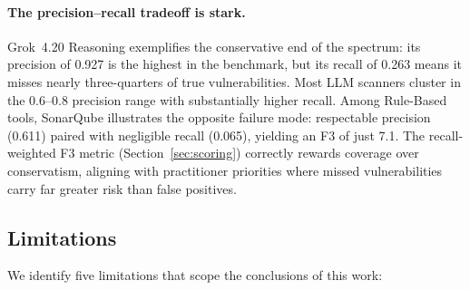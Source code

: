 \paragraph{The precision--recall tradeoff is stark.}
Grok~4.20 Reasoning exemplifies the conservative end of the spectrum:
its precision of 0.927 is the highest in the benchmark, but its recall
of 0.263 means it misses nearly three-quarters of true vulnerabilities.
Most LLM scanners cluster in the 0.6--0.8 precision range with
substantially higher recall.  Among
Rule-Based tools, SonarQube illustrates the opposite failure mode:
respectable precision (0.611) paired with negligible recall (0.065),
yielding an F3 of just 7.1.  The recall-weighted F3 metric (Section~\ref{sec:scoring}) correctly rewards coverage over conservatism, aligning with
practitioner priorities where missed vulnerabilities carry far greater risk than false positives.

\subsection{Limitations}
\label{sec:limitations}

We identify five limitations that scope the conclusions of this work:

